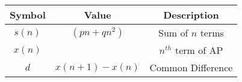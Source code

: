 \begin{tabular}{|c|c|c|}
    \hline
      \textbf{Symbol}   &  \textbf{Value} & \textbf{Description}\\
    \hline
       $s(n)$  & $(pn + qn^2)$ & Sum of $n$ terms\\
    \hline
        $x(n)$ &  & $n^{th}$ term of AP\\
    \hline
        $d$ & $x(n+1) - x(n)$ &Common Difference\\
    \hline 
\end{tabular}
